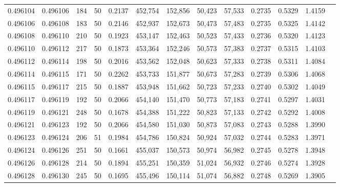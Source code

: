 \begin{tabular}{rrrrrrrrrrrrr}
0.496104 & 0.496106 &   184 &  50 &                                     0.2137 & 452,754 & 152,856 &  50,423 &  57,533 & 0.2735 & 0.5329 & 1.4159 \\
0.496106 & 0.496108 &   183 &  50 &                                     0.2146 & 452,937 & 152,673 &  50,473 &  57,483 & 0.2735 & 0.5325 & 1.4142 \\
0.496108 & 0.496110 &   210 &  50 &                                     0.1923 & 453,147 & 152,463 &  50,523 &  57,433 & 0.2736 & 0.5320 & 1.4123 \\
0.496110 & 0.496112 &   217 &  50 &                                     0.1873 & 453,364 & 152,246 &  50,573 &  57,383 & 0.2737 & 0.5315 & 1.4103 \\
0.496112 & 0.496114 &   198 &  50 &                                     0.2016 & 453,562 & 152,048 &  50,623 &  57,333 & 0.2738 & 0.5311 & 1.4084 \\
0.496114 & 0.496115 &   171 &  50 &                                     0.2262 & 453,733 & 151,877 &  50,673 &  57,283 & 0.2739 & 0.5306 & 1.4068 \\
0.496115 & 0.496117 &   215 &  50 &                                     0.1887 & 453,948 & 151,662 &  50,723 &  57,233 & 0.2740 & 0.5302 & 1.4049 \\
0.496117 & 0.496119 &   192 &  50 &                                     0.2066 & 454,140 & 151,470 &  50,773 &  57,183 & 0.2741 & 0.5297 & 1.4031 \\
0.496119 & 0.496121 &   248 &  50 &                                     0.1678 & 454,388 & 151,222 &  50,823 &  57,133 & 0.2742 & 0.5292 & 1.4008 \\
0.496121 & 0.496123 &   192 &  50 &                                     0.2066 & 454,580 & 151,030 &  50,873 &  57,083 & 0.2743 & 0.5288 & 1.3990 \\
0.496123 & 0.496124 &   206 &  51 &                                     0.1984 & 454,786 & 150,824 &  50,924 &  57,032 & 0.2744 & 0.5283 & 1.3971 \\
0.496124 & 0.496126 &   251 &  50 &                                     0.1661 & 455,037 & 150,573 &  50,974 &  56,982 & 0.2745 & 0.5278 & 1.3948 \\
0.496126 & 0.496128 &   214 &  50 &                                     0.1894 & 455,251 & 150,359 &  51,024 &  56,932 & 0.2746 & 0.5274 & 1.3928 \\
0.496128 & 0.496130 &   245 &  50 &                                     0.1695 & 455,496 & 150,114 &  51,074 &  56,882 & 0.2748 & 0.5269 & 1.3905 \\

\end{tabular}

